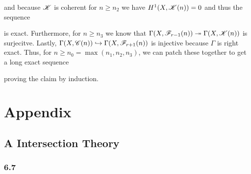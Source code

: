 \documentclass[12pt]{article}
\newcommand{\ch}[1]{\mathrm{char}\left( #1 \right)}
\begin{document}
and because $\mathscr{K}$ is coherent for $n \ge n_2$ we have $H^1(X, \mathscr{K}(n)) = 0$ and thus the sequence
\begin{center}
\end{center}
is exact. 
Furthermore, for $n \ge n_3$ we know that $\Gamma(X, \mathscr{F}_{r-1}(n)) \twoheadrightarrow \Gamma(X, \mathscr{K}(n))$ is surjecitve. Lastly, $\Gamma(X, \mathscr{C}(n)) \hookrightarrow \Gamma(X, \mathscr{F}_{r+1}(n))$ is injective because $\Gamma$ is right exact. Thus, for $n \ge n_0 = \max{(n_1, n_2, n_3)}$, we can patch these together to get a long exact sequence
\begin{center}
\end{center}
proving the claim by induction.


\section{Appendix}

\subsection{A Intersection Theory}

\subsubsection{6.7}

\newcommand{\td}{\mathrm{td}}
\renewcommand{\ch}{\mathrm{ch}}
\end{document}
